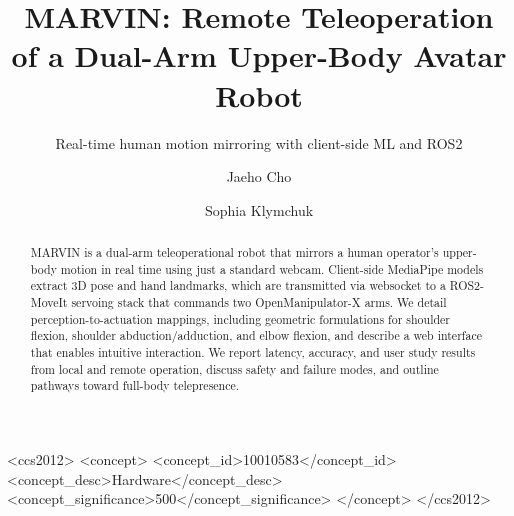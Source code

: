 \documentclass[manuscript,screen]{acmart} %
\begin{document}
\title{MARVIN: Remote Teleoperation of a Dual-Arm Upper-Body Avatar Robot}
\subtitle{Real-time human motion mirroring with client-side ML and ROS2}

\author{Jaeho Cho}
\author{Sophia Klymchuk}
\authornotemark[1]

\renewcommand{\shortauthors}{Last}

\begin{abstract}
MARVIN is a dual-arm teleoperational robot that mirrors a human 
operator's upper-body motion in real time using just a standard webcam. 
Client-side MediaPipe models extract 3D pose and hand landmarks, which are 
transmitted via websocket to a ROS2-MoveIt servoing stack that commands two 
OpenManipulator-X arms. We detail perception-to-actuation mappings, including 
geometric formulations for shoulder flexion, shoulder abduction/adduction, and 
elbow flexion, and describe a web interface that enables intuitive interaction. 
We report latency, accuracy, and user study results from local and remote 
operation, discuss safety and failure modes, and outline pathways toward 
full-body telepresence. %
\end{abstract}

\begin{CCSXML}
<ccs2012>
   <concept>
       <concept_id>10010583</concept_id>
       <concept_desc>Hardware</concept_desc>
       <concept_significance>500</concept_significance>
       </concept>
 </ccs2012>
\end{CCSXML}




\maketitle
\end{document}

